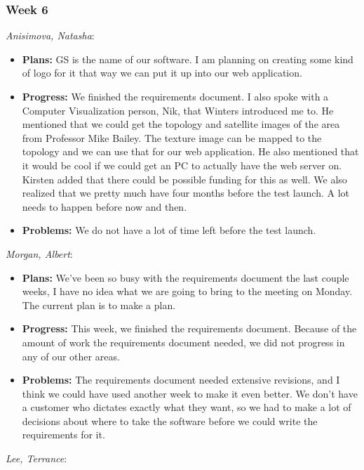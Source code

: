\documentclass[10pt,draftclsnofoot,onecolumn]{IEEEtran}
\newcommand{\subsubsubsection}[1]{
	\hfill\break\textit{#1}:
}
\begin{document}
\subsubsection{Week 6}
\subsubsubsection{Anisimova, Natasha}
\begin{itemize}
	\item \textbf{Plans: }
	GS is the name of our software. I am planning on creating some kind of logo for it that way we can put it up into our web application.
	\item \textbf{Progress: }
	We finished the requirements document. I also spoke with a Computer Visualization person, Nik, that Winters introduced me to. He mentioned that we could get the topology and satellite images of the area from Professor Mike Bailey. The texture image can be mapped to the topology and we can use that for our web application. He also mentioned that it would be cool if we could get an PC to actually have the web server on. Kirsten added that there could be possible funding for this as well. We also realized that we pretty much have four months before the test launch. A lot needs to happen before now and then.
	\item \textbf{Problems: }
	We do not have a lot of time left before the test launch.
\end{itemize}
\subsubsubsection{Morgan, Albert}
\begin{itemize}
	\item \textbf{Plans: }
	We've been so busy with the requirements document the last couple weeks, I have no idea what we are going to bring to the meeting on Monday. The current plan is to make a plan.
	\item \textbf{Progress: }
	This week, we finished the requirements document. Because of the amount of work the requirements document needed, we did not progress in any of our other areas.
	\item \textbf{Problems: }
	The requirements document needed extensive revisions, and I think we could have used another week to make it even better. We don't have a customer who dictates exactly what they want, so we had to make a lot of decisions about where to take the software before we could write the requirements for it.
\end{itemize}
\subsubsubsection{Lee, Terrance}
\end{document}
